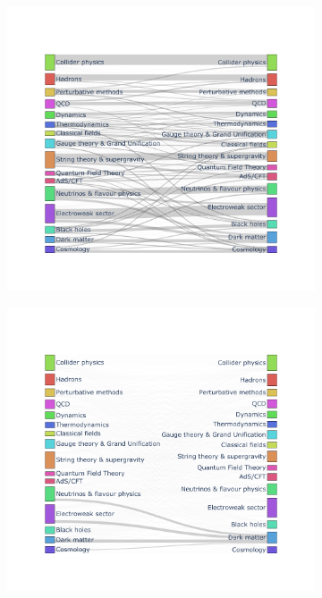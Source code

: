 \documentclass{article}
\begin{document}
 \begin{figure}[h]
     \centering
     
\begin{subfigure}{.45\textwidth}
\includegraphics[width=1.05\textwidth,trim={2.1cm 1.5cm 2.1cm 1.5cm},clip]{Fig3a.pdf}
    \label{fig:sankey_a}
\end{subfigure}\hfill%
\begin{subfigure}{0.45\textwidth}
\includegraphics[width=1.05\textwidth,trim={2.1cm 1.5cm 2.1cm 1.5cm},clip]{Fig3b.pdf}

\end{subfigure}
\end{figure}
\end{document}
